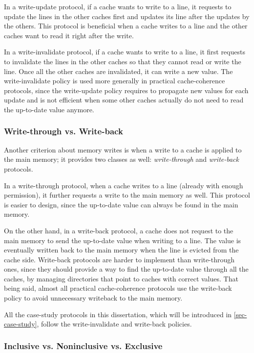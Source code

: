 In a write-update protocol, if a cache wants to write to a line, it requests to update the lines in the other caches first and updates its line after the updates by the others.
This protocol is beneficial when a cache writes to a line and the other caches want to read it right after the write.

In a write-invalidate protocol, if a cache wants to write to a line, it first requests to invalidate the lines in the other caches so that they cannot read or write the line.
Once all the other caches are invalidated, it can write a new value.
The write-invalidate policy is used more generally in practical cache-coherence protocols, since the write-update policy requires to propagate new values for each update and is not efficient when some other caches actually do not need to read the up-to-date value anymore.

\subsubsection{Write-through vs. Write-back}

Another criterion about memory writes is when a write to a cache is applied to the main memory; it provides two classes as well: \emph{write-through} and \emph{write-back} protocols.

In a write-through protocol, when a cache writes to a line (already with enough permission), it further requests a write to the main memory as well.
This protocol is easier to design, since the up-to-date value can always be found in the main memory.

On the other hand, in a write-back protocol, a cache does not request to the main memory to send the up-to-date value when writing to a line.
The value is eventually written back to the main memory when the line is evicted from the cache side.
Write-back protocols are harder to implement than write-through ones, since they should provide a way to find the up-to-date value through all the caches, \eg{} by managing directories that point to caches with correct values.
That being said, almost all practical cache-coherence protocols use the write-back policy to avoid unnecessary writeback to the main memory.

All the case-study protocols in this dissertation, which will be introduced in \autoref{sec-case-study}, follow the write-invalidate and write-back policies.

\subsubsection{Inclusive vs. Noninclusive vs. Exclusive}

